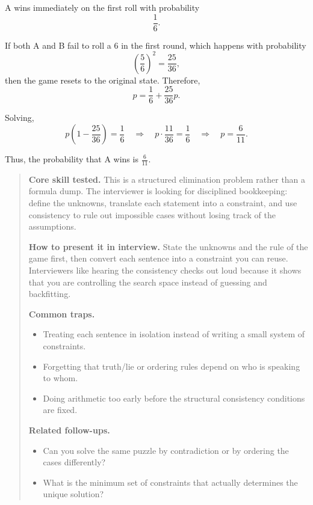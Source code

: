 \documentclass[11pt,letterpaper,openany]{book}
\newenvironment{EditorialNote}
  {\begin{quote}\small\setlength{\parskip}{0.25em}}
  {\end{quote}}
\newcommand{\QuestionSpacer}{\vspace{0.4em}}
\begin{document}
A wins immediately on the first roll with probability
\[
\frac{1}{6}.
\]

If both A and B fail to roll a 6 in the first round, which happens with probability
\[
\left(\frac{5}{6}\right)^2 = \frac{25}{36},
\]
then the game resets to the original state. Therefore,
\[
p = \frac{1}{6} + \frac{25}{36}p.
\]

Solving,
\[
p\left(1-\frac{25}{36}\right) = \frac{1}{6}
\quad\Rightarrow\quad
p\cdot \frac{11}{36} = \frac{1}{6}
\quad\Rightarrow\quad
p = \frac{6}{11}.
\]

Thus, the probability that A wins is \(\boxed{\frac{6}{11}}\).

\begin{EditorialNote}


\textbf{Core skill tested.} This is a structured elimination problem rather than a formula dump. The interviewer is looking for disciplined bookkeeping: define the unknowns, translate each statement into a constraint, and use consistency to rule out impossible cases without losing track of the assumptions.

\textbf{How to present it in interview.} State the unknowns and the rule of the game first, then convert each sentence into a constraint you can reuse. Interviewers like hearing the consistency checks out loud because it shows that you are controlling the search space instead of guessing and backfitting.

\textbf{Common traps.}
\begin{itemize}
\item Treating each sentence in isolation instead of writing a small system of constraints.
\item Forgetting that truth/lie or ordering rules depend on who is speaking to whom.
\item Doing arithmetic too early before the structural consistency conditions are fixed.
\end{itemize}

\textbf{Related follow-ups.}
\begin{itemize}
\item Can you solve the same puzzle by contradiction or by ordering the cases differently?
\item What is the minimum set of constraints that actually determines the unique solution?
\end{itemize}


\end{EditorialNote}
\QuestionSpacer
\end{document}
